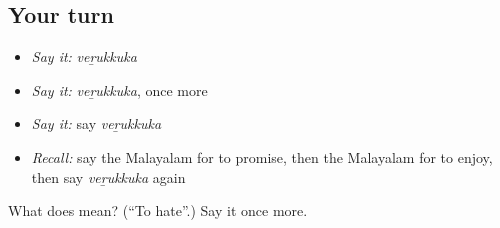 \subsection*{Your turn}
\begin{itemize}
\raggedright
  \item \emph{Say it:} \emph{veṟukkuka}
  \item \emph{Say it:} \emph{veṟukkuka}, once more
  \item \emph{Say it:} say \emph{veṟukkuka}
  \item \emph{Recall:} say the Malayalam for to promise, then the Malayalam for to enjoy, then say \emph{veṟukkuka} again
\end{itemize}

\begin{tcolorbox}[breakable,colback=teal!4,colframe=teal!35!black,title={Before you move on}]
What does  mean? (\textquotedblleft{}To hate\textquotedblright{}.) Say it once more.
\end{tcolorbox}
